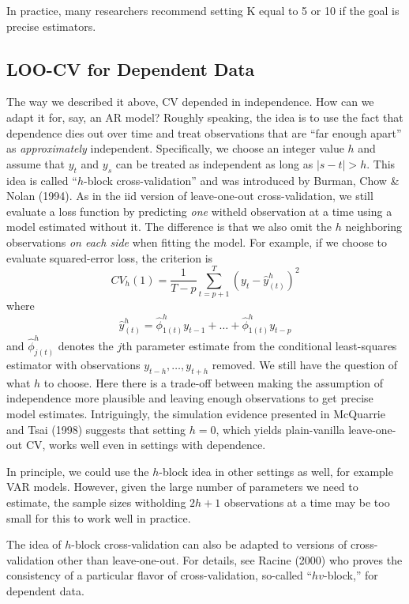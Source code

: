 In practice, many researchers recommend setting K equal to 5 or 10 if the goal is precise estimators.


\subsection{LOO-CV for Dependent Data}
The way we described it above, CV depended in independence. How can we adapt it for, say, an AR model? Roughly speaking, the idea is to use the fact that dependence dies out over time and treat observations that are ``far enough apart'' as \emph{approximately} independent. Specifically, we choose an integer value $h$ and assume that $y_t$ and $y_s$ can be treated as independent as long as $|s - t|>h$. This idea is called ``$h$-block cross-validation'' and was introduced by Burman, Chow \& Nolan (1994). As in the iid version of leave-one-out cross-validation, we still evaluate a loss function by predicting \emph{one} witheld observation at a time using a model estimated without it. The difference is that we also omit the $h$ neighboring observations \emph{on each side} when fitting the model. For example, if we choose to evaluate squared-error loss, the criterion is
	$$CV_h(1) = \frac{1}{T-p}\sum_{t = p+1}^T \left(y_t - \hat{y}_{(t)}^h\right)^2$$
where 
$$\hat{y}^h_{(t)} = \hat{\phi}^h_{1(t)} y_{t-1} + \hdots + \hat{\phi}^h_{1(t)}y_{t-p}$$
and $\hat{\phi}^h_{j(t)}$ denotes the $j$th parameter estimate from the conditional least-squares estimator with observations $y_{t-h}, \hdots,  y_{t+h}$ removed. We still have the question of what $h$ to choose. Here there is a trade-off between making the assumption of independence more plausible and leaving enough observations to get precise model estimates. Intriguingly, the simulation evidence presented in McQuarrie and Tsai (1998) suggests that setting $h=0$, which yields plain-vanilla leave-one-out CV, works well even in settings with dependence.

In principle, we could use the $h$-block idea in other settings as well, for example VAR models. However, given the large number of parameters we need to estimate, the sample sizes witholding $2h+1$ observations at a time may be too small for this to work well in practice.


The idea of $h$-block cross-validation can also be adapted to versions of cross-validation other than leave-one-out. For details, see Racine (2000) who proves the consistency of a particular flavor of cross-validation, so-called ``$hv$-block,'' for dependent data.








 
